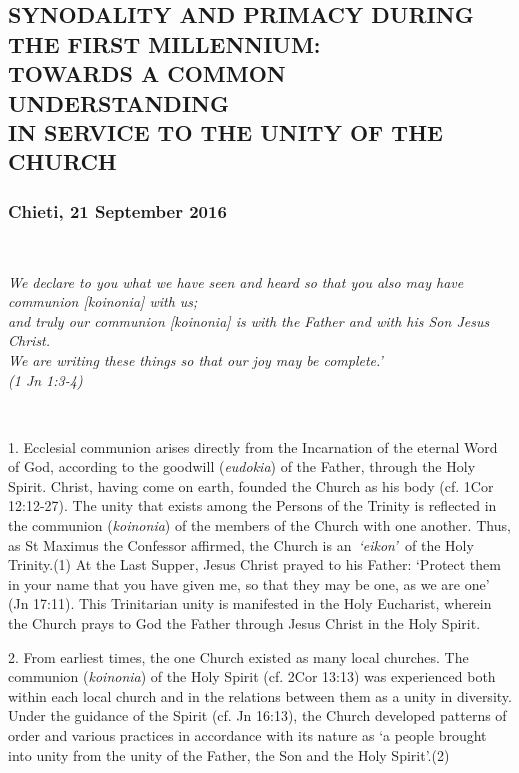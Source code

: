 \subsection{\texorpdfstring{SYNODALITY AND PRIMACY DURING THE FIRST
MILLENNIUM:\\
TOWARDS A COMMON UNDERSTANDING\\
IN SERVICE TO THE UNITY OF THE
CHURCH}{SYNODALITY AND PRIMACY DURING THE FIRST MILLENNIUM: TOWARDS A COMMON UNDERSTANDING IN SERVICE TO THE UNITY OF THE CHURCH}}\label{synodality-and-primacy-during-the-first-millennium-towards-a-common-understanding-in-service-to-the-unity-of-the-church}

\subsubsection{Chieti, 21 September
2016}\label{chieti-21-september-2016}

~

\emph{We declare to you what we have seen and heard so that you also may
have communion {[}koinonia{]} with us;\\
and truly our communion {[}koinonia{]} is with the Father and with his
Son Jesus Christ.\\
We are writing these things so that our joy may be complete.'\\
(1 Jn 1:3-4)}

~

1. Ecclesial communion arises directly from the Incarnation of the
eternal Word of God, according to the goodwill (\emph{eudokia}) of the
Father, through the Holy Spirit. Christ, having come on earth, founded
the Church as his body (cf. 1Cor 12:12-27). The unity that exists among
the Persons of the Trinity is reflected in the communion
(\emph{koinonia}) of the members of the Church with one another. Thus,
as St Maximus the Confessor affirmed, the Church is an~\emph{`eikon'~}of
the Holy Trinity.(1) At the Last Supper, Jesus Christ prayed to his
Father: `Protect them in your name that you have given me, so that they
may be one, as we are one' (Jn 17:11). This Trinitarian unity is
manifested in the Holy Eucharist, wherein the Church prays to God the
Father through Jesus Christ in the Holy Spirit.

2. From earliest times, the one Church existed as many local churches.
The communion (\emph{koinonia}) of the Holy Spirit (cf. 2Cor 13:13) was
experienced both within each local church and in the relations between
them as a unity in diversity. Under the guidance of the Spirit (cf. Jn
16:13), the Church developed patterns of order and various practices in
accordance with its nature as `a people brought into unity from the
unity of the Father, the Son and the Holy Spirit'.(2)

